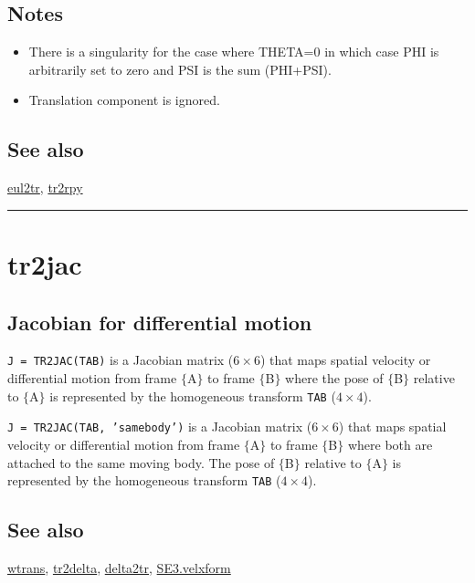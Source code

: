 \subsection*{Notes}
\begin{itemize}
  \item There is a singularity for the case where THETA=0 in which case PHI is arbitrarily    set to zero and PSI is the sum (PHI+PSI).
  \item Translation component is ignored.
\end{itemize}

\subsection*{See also}


\hyperlink{eul2tr}{\color{blue} eul2tr}, \hyperlink{tr2rpy}{\color{blue} tr2rpy}

\vspace{1.5ex}\rule{\textwidth}{1mm}

\hypertarget{tr2jac}{\section*{tr2jac}}
\subsection*{Jacobian for differential motion}


\texttt{J = TR2JAC(TAB)} is a Jacobian matrix ($6 \times 6$) that maps spatial velocity or
differential motion from frame $\{$A$\}$ to frame $\{$B$\}$ where the pose of $\{$B$\}$
relative to $\{$A$\}$ is represented by the homogeneous transform \texttt{TAB} ($4 \times 4$).



\texttt{J = TR2JAC(TAB, 'samebody')} is a Jacobian matrix ($6 \times 6$) that maps spatial
velocity or differential motion from frame $\{$A$\}$ to frame $\{$B$\}$ where both
are attached to the same moving body.  The pose of $\{$B$\}$ relative to $\{$A$\}$ is
represented by the homogeneous transform \texttt{TAB} ($4 \times 4$).


\subsection*{See also}


\hyperlink{wtrans}{\color{blue} wtrans}, \hyperlink{tr2delta}{\color{blue} tr2delta}, \hyperlink{delta2tr}{\color{blue} delta2tr}, \hyperlink{SE3.velxform}{\color{blue} SE3.velxform}

